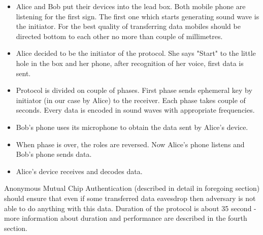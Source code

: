 \documentclass[11pt,titlepage]{article}
\theoremstyle{plain}
\begin{document}
\vspace{5mm}

\begin{itemize}
	\item Alice and Bob put their devices into the lead box. Both mobile phone are listening for the first sign. The first one which starts generating sound wave is the initiator. For the best quality of transferring data mobiles should be directed bottom to each other no more than couple of millimetres.
	\item Alice decided to be the initiator of the protocol. She says "Start" to the little hole in the box and her phone, after recognition of her voice, first data is sent.
	\item Protocol is divided on couple of phases. First phase sends ephemeral key by initiator (in our case by Alice) to the receiver. Each phase takes couple of seconds. Every data is encoded in sound waves with appropriate frequencies.
	\item Bob's phone uses its microphone to obtain the data sent by Alice's device.
	\item When phase is over, the roles are reversed. Now Alice's phone  listens and Bob's phone sends data.
	\item Alice's device receives and decodes data.
\end{itemize}

Anonymous Mutual Chip Authentication (described in detail in foregoing section) should ensure that even if some transferred data eavesdrop then adversary is not able to do anything with this data. Duration of the protocol is about 35 second - more information about duration and performance are described in the fourth section.
\end{document}
